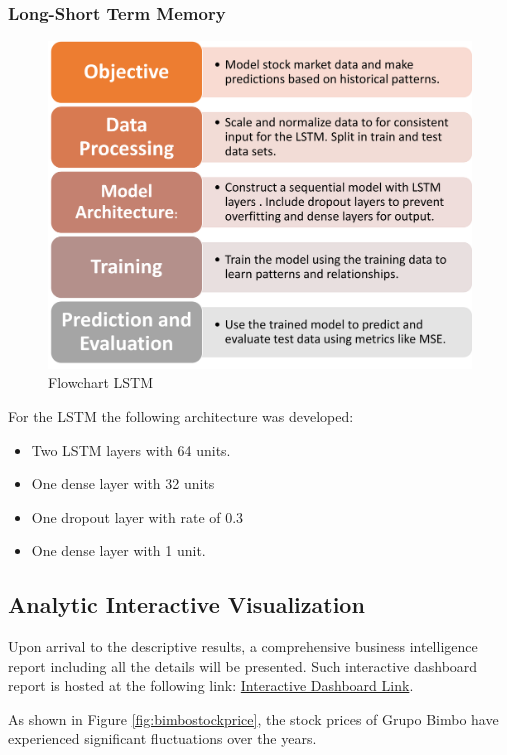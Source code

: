 \documentclass[conference]{IEEEtran}
\begin{document}
\subsubsection{Long-Short Term Memory}

\begin{figure}
    \centering
    \includegraphics[scale=0.35]{flowLSTM.png}
    \caption{Flowchart LSTM}
    \label{fig:enter-label}
\end{figure}
\hspace{1pt}
For the LSTM the following architecture was developed:
\begin{itemize}
    \item Two LSTM layers with 64 units.
    \item One dense layer with 32 units
    \item One dropout layer with rate of 0.3
    \item One dense layer with 1 unit.
\end{itemize}
\subsection{Analytic Interactive Visualization}

Upon arrival to the descriptive results, a comprehensive business intelligence report including all the details will be presented. Such interactive dashboard report is hosted at the following link: \href{https://lookerstudio.google.com/reporting/cae0f4fa-54c3-483d-b90c-484b229ca1c7}{Interactive Dashboard Link}.

As shown in Figure \ref{fig:bimbostockprice}, the stock prices of Grupo Bimbo have experienced significant fluctuations over the years.
\end{document}
